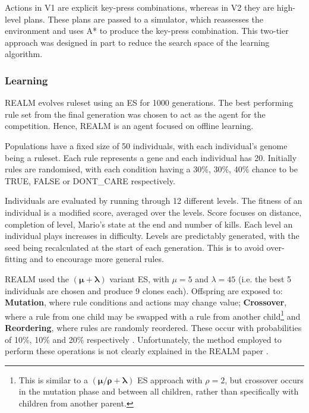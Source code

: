 Actions in V1 are explicit key-press combinations, whereas in V2 they are high-level plans. These plans are passed to a simulator, which reassesses the environment and uses A* to produce the key-press combination. This two-tier approach was designed in part to reduce the search space of the learning algorithm. \cite[pp.~85-87]{realm}

\subsubsection*{\hspace{6pt}Learning}

REALM evolves ruleset using an ES for 1000 generations. The best performing rule set from the final generation was chosen to act as the agent for the competition. Hence, REALM is an agent focused on offline learning. \cite[pp.~87-89]{realm}

Populations have a fixed size of 50 individuals, with each individual's genome being a ruleset. Each rule represents a gene and each individual has 20. Initially rules are randomised, with each condition having a 30\%, 30\%, 40\% chance to be {\footnotesize TRUE}, {\footnotesize FALSE} or {\footnotesize DONT\_CARE} respectively.

Individuals are evaluated by running through 12 different levels. The fitness of an individual is a modified score, averaged over the levels. Score focuses on distance, completion of level, Mario's state at the end and number of kills. Each level an individual plays increases in difficulty. Levels are predictably generated, with the seed being recalculated at the start of each generation. This is to avoid over-fitting and to encourage more general rules.

REALM used the $\pmb{(\mu  + \lambda)}$ variant ES, with $\mu = 5$ and $\lambda = 45$ (i.e. the best 5 individuals are chosen and produce 9 clones each). Offspring are exposed to: \textbf{Mutation}, where rule conditions and actions may change value; \textbf{Crossover}, where a rule from one child may be swapped with a rule from another child\footnote{This is similar to a  $\pmb{(\mu/\rho  + \lambda)}$ ES approach with $\rho = 2$, but crossover occurs in the mutation phase and between all children, rather than specifically with children from another parent.} and \textbf{Reordering}, where rules are randomly reordered. These occur with probabilities of 10\%, 10\% and 20\% respectively \cite[p.~88]{realm}. Unfortunately, the method employed to perform these operations is not clearly explained in the REALM paper \cite{realm}.

